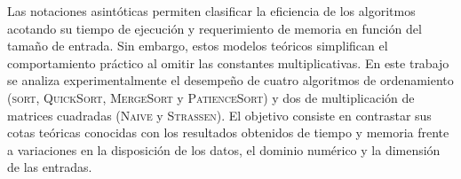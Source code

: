 Las notaciones asintóticas permiten clasificar la eficiencia de los algoritmos acotando su tiempo de ejecución y requerimiento de memoria en función del tamaño de entrada. Sin embargo, estos modelos teóricos simplifican el comportamiento práctico al omitir las constantes multiplicativas. En este trabajo se analiza experimentalmente el desempeño de cuatro algoritmos de ordenamiento (\textsc{sort}, \textsc{QuickSort}, \textsc{MergeSort} y \textsc{PatienceSort}) y dos de multiplicación de matrices cuadradas (\textsc{Naive} y \textsc{Strassen}). El objetivo consiste en contrastar sus cotas teóricas conocidas con los resultados obtenidos de tiempo y memoria frente a variaciones en la disposición de los datos, el dominio numérico y la dimensión de las entradas.